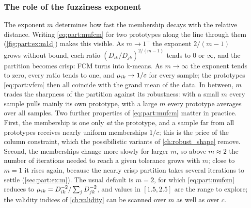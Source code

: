 \subsubsection{The role of the fuzziness exponent}\label{sec:part:m}

The exponent $m$ determines how fast the membership decays with the relative distance. Writing \eqref{eq:part:mufcm} for two prototypes along the line through them (\cref{fig:part:ex:m1d}) makes this visible. As $m\to1^+$ the exponent $2/(m-1)$ grows without bound, each ratio $(D_{ik}/D_{jk})^{2/(m-1)}$ tends to $0$ or $\infty$, and the partition becomes crisp: FCM turns into k-means. As $m\to\infty$ the exponent tends to zero, every ratio tends to one, and $\mu_{ik}\to1/c$ for every sample; the prototypes \eqref{eq:part:vfcm} then all coincide with the grand mean of the data. In between, $m$ trades the sharpness of the partition against its robustness: with a small $m$ every sample pulls mainly its own prototype, with a large $m$ every prototype averages over all samples. Two further properties of \eqref{eq:part:mufcm} matter in practice. First, the membership is one only \emph{at} the prototype, and a sample far from all prototypes receives nearly uniform memberships $1/c$; this is the price of the column constraint, which the possibilistic variants of \cref{ch:robust_shape} remove. Second, the memberships change more slowly for larger $m$, so above $m\approx2$ the number of iterations needed to reach a given tolerance grows with $m$; close to $m=1$ it rises again, because the nearly crisp partition takes several iterations to settle (\cref{sec:part:ex:m}). The usual default is $m=2$, for which \eqref{eq:part:mufcm} reduces to $\mu_{ik}=D^{-2}_{ik}/\sum_j D^{-2}_{jk}$, and values in $[1.5,2.5]$ are the range to explore; the validity indices of \cref{ch:validity} can be scanned over $m$ as well as over $c$.

